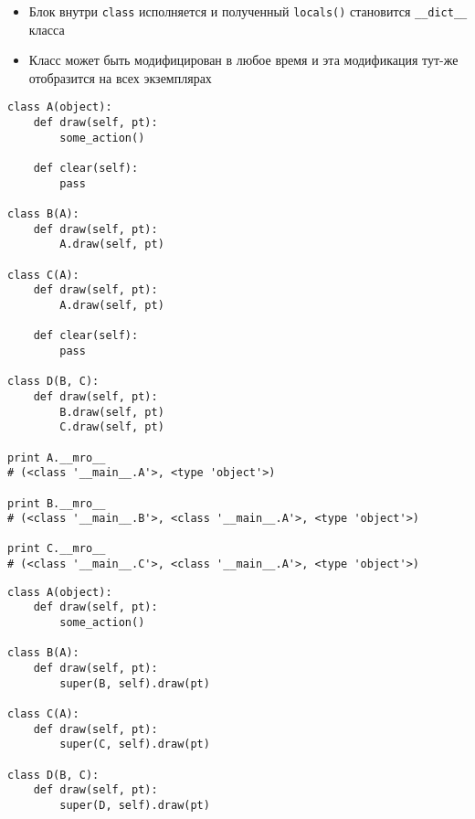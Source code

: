 \documentclass{article}
\begin{document}
\begin{itemize}

\item Блок внутри \lstinline!class! исполняется и 
        полученный \lstinline!locals()! становится 
            \lstinline!__dict__! класса
\item Класс может быть модифицирован в любое время и эта модификация 
        тут-же отобразится на всех экземплярах 

\end{itemize}
\newpage

{
\Large \vspace{15pt}
\begin{lstlisting}
class A(object):
    def draw(self, pt):
        some_action()

    def clear(self):
        pass

class B(A):
    def draw(self, pt):
        A.draw(self, pt)

class C(A):
    def draw(self, pt):
        A.draw(self, pt)

    def clear(self):
        pass

class D(B, C):
    def draw(self, pt):
        B.draw(self, pt)
        C.draw(self, pt)

print A.__mro__ 
# (<class '__main__.A'>, <type 'object'>)

print B.__mro__ 
# (<class '__main__.B'>, <class '__main__.A'>, <type 'object'>)

print C.__mro__ 
# (<class '__main__.C'>, <class '__main__.A'>, <type 'object'>)

\end{lstlisting}
}
\newpage
\begin{lstlisting}
class A(object):
    def draw(self, pt):
        some_action()

class B(A):
    def draw(self, pt):
        super(B, self).draw(pt)

class C(A):
    def draw(self, pt):
        super(C, self).draw(pt)

class D(B, C):
    def draw(self, pt):
        super(D, self).draw(pt)
\end{lstlisting}
\newpage
\end{document}
